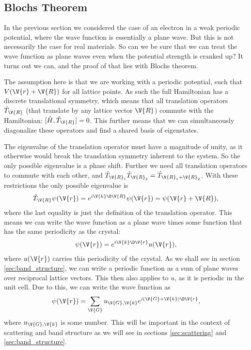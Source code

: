 \documentclass[main.tex]{subfiles}
\begin{document}
	
	
	\subsection{Blochs Theorem}
	In the previous section we considered the case of an electron in a weak periodic potential, where the wave function is essentially a plane wave. But this is not necessarily the case for real materials. So can we be sure that we can treat the wave function as plane waves even when the potential strength is cranked up? It turns out we can, and the proof of that lies with Blochs theorem.
	
	The assumption here is that we are working with a periodic potential, such that $ V(\V{r} + \V{R}) $ for all lattice points. As such the full Hamiltonian has a discrete translational symmetry, which means that all translation operators $ \hat{T}_{\V{R}} $ (that translate by any lattice vector $ \V{R} $) commute with the Hamiltonian: $ [\hat{H}, \hat{T}_{\V{R}}] = 0$. This further means that we can simultaneously diagonalize these operators and find a shared basis of eigenstates.
	
	The eigenvalue of the translation operator must have a magnitude of unity, as it otherwise would break the translation symmetry inherent to the system. So the only possible eigenvalue is a phase shift. Further we need all translation operators to commute with each other, and $ \hat{T}_{\V{R}_1} \hat{T}_{\V{R}_2} = \hat{T}_{\V{R}_1 + \V{R}_2} $. With these restrictions the only possible eigenvalue is
	\begin{equation}
		\hat{T}_{\V{R}} \psi(\V{r}) = e^{i\V{k} \D\V{R}} \psi(\V{r}) = \psi(\V{r}+\V{R}),
	\end{equation}
	where the last equality is just the definition of the translation operator. This means we can write the wave function as a plane wave times some function that has the same periodicity as the crystal:
	\begin{equation}
		\psi(\V{r}) = e^{i\V{k} \D \V{r}} u(\V{r}),
	\end{equation}
	where $ u(\V{r}) $ carries this periodicity of the crystal. As we shall see in section \ref{sec:band_structure}, we can write a periodic function as a sum of plane waves over reciprocal lattice vectors. This then also applies to $ u $, as it is periodic in the unit cell. Due to this, we can write the wave function as
	\begin{equation}\label{key}
		\psi(\V{r}) = \sum_{\V{G}} u_{\V{G},\V{k}} e^{i(\V{G} + \V{k}) \D \V{r}},
	\end{equation}
	where $ u_{\V{G},\V{k}} $ is some number. This will be important in the context of scattering and band structure as we will see in sections \ref{sec:scattering} and \ref{sec:band_structure}.
	
\end{document}

